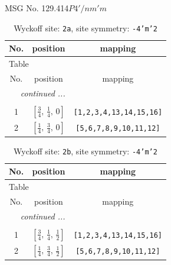 \documentclass[fleqn,8pt]{jsarticle}
\begin{document}
\setcounter{MaxMatrixCols}{32}

\renewcommand{\tablename}{Table~}
\renewcommand{\figurename}{Figure~}
\begin{center}
\LARGE
MSG No. 129.414\quad$P4'/nm'm$
\end{center}
\renewcommand{\arraystretch}{1.2}
\begin{longtable}{ccc}
\caption{Wyckoff site: {\tt 2a}, site symmetry: {\tt -4'm'2}}
 \\
 \hline \hline
No. & position & mapping \\ \hline \endfirsthead

\multicolumn{2}{l}{\tablename\ \thetable{}} \\
 \hline \hline
No. & position & mapping \\ \hline \endhead

 \hline \hline
\multicolumn{2}{r}{\footnotesize\it continued ...} \\ \endfoot

 \hline \hline
\multicolumn{2}{r}{} \\ \endlastfoot

1 & $\left[ \frac{3}{4},\, \frac{1}{4},\, 0 \right]$ & {\tt [1,2,3,4,13,14,15,16]} \\ \hline
2 & $\left[ \frac{1}{4},\, \frac{3}{4},\, 0 \right]$ & {\tt [5,6,7,8,9,10,11,12]} \\
\end{longtable}
\renewcommand{\arraystretch}{1.2}
\begin{longtable}{ccc}
\caption{Wyckoff site: {\tt 2b}, site symmetry: {\tt -4'm'2}}
 \\
 \hline \hline
No. & position & mapping \\ \hline \endfirsthead

\multicolumn{2}{l}{\tablename\ \thetable{}} \\
 \hline \hline
No. & position & mapping \\ \hline \endhead

 \hline \hline
\multicolumn{2}{r}{\footnotesize\it continued ...} \\ \endfoot

 \hline \hline
\multicolumn{2}{r}{} \\ \endlastfoot

1 & $\left[ \frac{3}{4},\, \frac{1}{4},\, \frac{1}{2} \right]$ & {\tt [1,2,3,4,13,14,15,16]} \\ \hline
2 & $\left[ \frac{1}{4},\, \frac{3}{4},\, \frac{1}{2} \right]$ & {\tt [5,6,7,8,9,10,11,12]} \\
\end{longtable}
\end{document}
